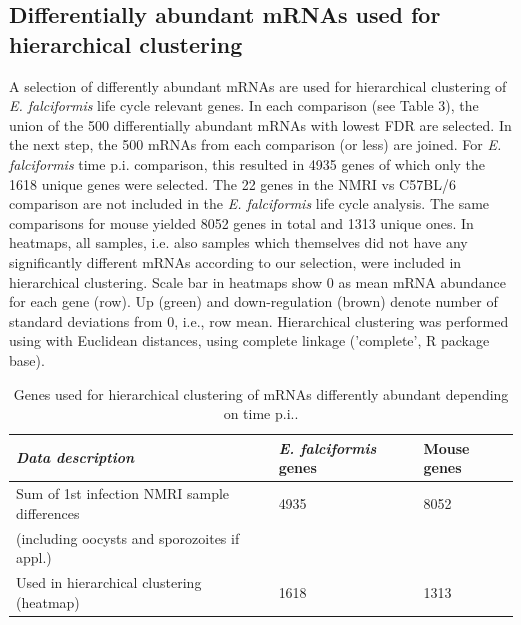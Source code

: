 \documentclass{bmcart}
\begin{document}
\subsection{Differentially abundant mRNAs used for hierarchical clustering}
A selection of differently abundant mRNAs are used for hierarchical clustering of \textit{E. falciformis} life cycle relevant genes. In each comparison (see Table 3), the union of the 500 differentially abundant mRNAs with lowest FDR are selected. In the next step, the 500 mRNAs from each comparison (or less) are joined. For \textit{E. falciformis} time p.i. comparison, this resulted in 4935 genes of which only the 1618 unique genes were selected. The 22 genes in the NMRI vs C57BL/6 comparison are not included in the \textit{E. falciformis} life cycle analysis. The same comparisons for mouse yielded 8052 genes in total and 1313 unique ones. In heatmaps, all samples, i.e. also samples which themselves did not have any significantly different mRNAs according to our selection, were included in hierarchical clustering. Scale bar in heatmaps show 0 as mean mRNA abundance for each gene (row). Up (green) and down-regulation (brown) denote number of standard deviations from 0, i.e., row mean. Hierarchical clustering was performed using with Euclidean distances, using complete linkage ('complete', R package base).

\setlength{\tabcolsep}{10pt}
\begin{table}[H]
\small
\begin{center}
\caption{Genes used for hierarchical clustering of mRNAs differently abundant depending on time p.i..}
\begin{tabular}{*3l}    \toprule
	\textit{Data description} & \emph{E. falciformis} genes & Mouse genes	\\ \midrule
	Sum of 1st infection NMRI sample differences	& 4935 & 8052 \\ 
	(including oocysts and sporozoites if appl.)	\\	
	Used in hierarchical clustering (heatmap)  	& 1618 & 1313 \\ 	\bottomrule	
\hline
\end{tabular}
\end{center}
\end{table}



\end{document}
